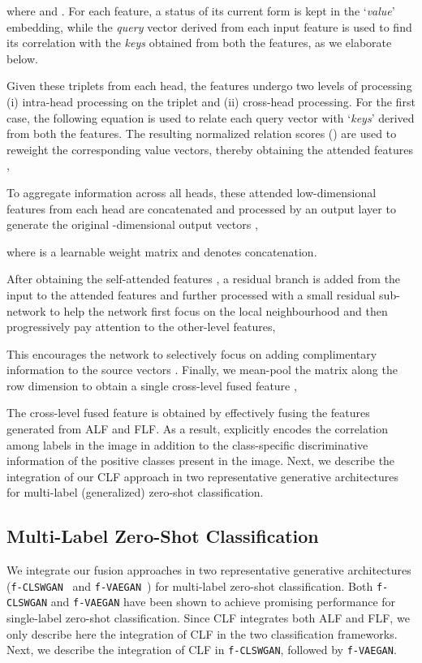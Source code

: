 \documentclass[final]{cvpr}
\newcommand{\clswgan}{\texttt{f-CLSWGAN}}
\newcommand{\vaegan}{\texttt{f-VAEGAN}}
\begin{document}
where  and  . For each feature, a status of its current form is kept in the `\emph{value}' embedding, while the \emph{query} vector derived from each input feature is used to find its correlation with the \emph{keys} obtained from both the features, as we elaborate below.

Given these triplets from each head, the features undergo two levels of processing (i) intra-head processing on the triplet and (ii) cross-head processing. For the first case, the following equation is used to relate each query vector with `\emph{keys}' derived from both the features.  The resulting normalized relation scores () are used to reweight the corresponding value vectors, thereby obtaining the attended features , 

To aggregate information across all heads, these attended low-dimensional features from each head are concatenated and processed by an output layer to generate the original -dimensional output vectors , 

where  is a learnable weight matrix and  denotes concatenation. 

After obtaining the self-attended features , a residual branch is added from the input to the attended features  and further processed with a small residual sub-network  to help the network first focus on the local neighbourhood and then progressively pay attention to the other-level features, 

This encourages the network to selectively focus on adding complimentary information to the source vectors . 
Finally, we mean-pool the matrix  along the row dimension to obtain a single cross-level fused feature , 


The cross-level fused feature  is obtained by effectively fusing the features generated from ALF and FLF. As a result,  explicitly encodes the correlation among labels in the image in addition to the class-specific discriminative information of the positive classes present in the image. Next, we describe the integration of our CLF approach in two representative generative architectures for multi-label (generalized) zero-shot classification. 


\subsection{Multi-Label Zero-Shot Classification\label{sec:feat_syn}}
We integrate our fusion approaches in two representative generative architectures (\clswgan{}~\cite{xian2018feature} and \vaegan{}~\cite{xian2019f}) for  multi-label zero-shot classification. Both \clswgan{} and \vaegan{} have been shown to achieve promising performance for single-label zero-shot classification. Since CLF integrates both ALF and FLF, we only describe here the integration of CLF in the two classification frameworks. Next, we describe the integration of CLF in \clswgan{}, followed by \vaegan{}.
\end{document}
